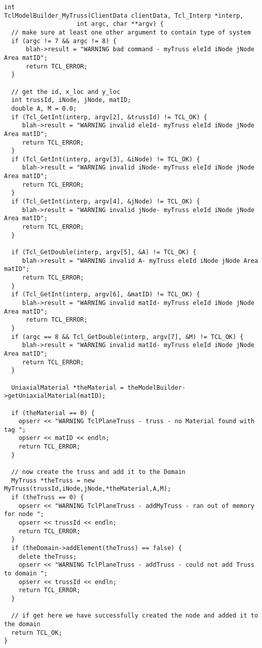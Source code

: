\documentclass[12pt]{article}
\begin{document}
{\sf \begin{verbatim}
int
TclModelBuilder_MyTruss(ClientData clientData, Tcl_Interp *interp, 
	                int argc, char **argv) {
  // make sure at least one other argument to contain type of system
  if (argc != 7 && argc != 8) {
      blah->result = "WARNING bad command - myTruss eleId iNode jNode Area matID";
      return TCL_ERROR;
  }    

  // get the id, x_loc and y_loc
  int trussId, iNode, jNode, matID;
  double A, M = 0.0;
  if (Tcl_GetInt(interp, argv[2], &trussId) != TCL_OK) {
     blah->result = "WARNING invalid eleId- myTruss eleId iNode jNode Area matID";
     return TCL_ERROR;
  }
  if (Tcl_GetInt(interp, argv[3], &iNode) != TCL_OK) {
     blah->result = "WARNING invalid iNode- myTruss eleId iNode jNode Area matID";
     return TCL_ERROR;
  }
  if (Tcl_GetInt(interp, argv[4], &jNode) != TCL_OK) {
     blah->result = "WARNING invalid jNode- myTruss eleId iNode jNode Area matID";
     return TCL_ERROR;
  }

  if (Tcl_GetDouble(interp, argv[5], &A) != TCL_OK) {
     blah->result = "WARNING invalid A- myTruss eleId iNode jNode Area matID";
     return TCL_ERROR;
  }
  if (Tcl_GetInt(interp, argv[6], &matID) != TCL_OK) {
     blah->result = "WARNING invalid matId- myTruss eleId iNode jNode Area matID";
      return TCL_ERROR;
  }
  if (argc == 8 && Tcl_GetDouble(interp, argv[7], &M) != TCL_OK) {
     blah->result = "WARNING invalid matId- myTruss eleId iNode jNode Area matID";
     return TCL_ERROR;
  }  
  
  UniaxialMaterial *theMaterial = theModelBuilder->getUniaxialMaterial(matID);

  if (theMaterial == 0) {
    opserr << "WARNING TclPlaneTruss - truss - no Material found with tag ";
    opserr << matID << endln;
    return TCL_ERROR;
  }

  // now create the truss and add it to the Domain
  MyTruss *theTruss = new MyTruss(trussId,iNode,jNode,*theMaterial,A,M);
  if (theTruss == 0) {
    opserr << "WARNING TclPlaneTruss - addMyTruss - ran out of memory for node ";
    opserr << trussId << endln;
    return TCL_ERROR;
  }
  if (theDomain->addElement(theTruss) == false) {
    delete theTruss;
    opserr << "WARNING TclPlaneTruss - addTruss - could not add Truss to domain ";
    opserr << trussId << endln;
    return TCL_ERROR;
  }

  // if get here we have successfully created the node and added it to the domain
  return TCL_OK;
}
\end{verbatim}}
\end{document}
